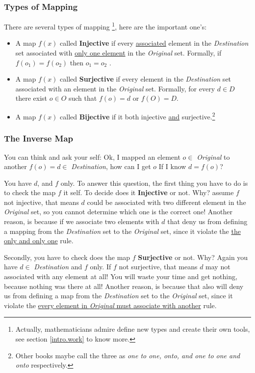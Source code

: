 \subsubsection{Types of Mapping}
There are several types of mapping \footnote{Actually, mathematicians admire define new types and create their own tools, see section \ref{intro.work} to know more.}, here are the important one's:
\begin{itemize}
    \item A map $f(x)$ called {\bf Injective} if every \underline{associated} element in the {\it Destination} set associated with \underline{only one element} in the {\it Original} set. Formally, if $f(o_1) = f(o_2)$ then $o_1 = o_2$  .
    \item A map $f(x)$ called {\bf Surjective} if every element in the {\it Destination} set associated with an element in the {\it Original} set. Formally, for every $d \in D$ there exist $o \in O$ such that $f(o)=d$ or $f(O)=D$.
    \item A map $f(x)$ called {\bf Bijective} if it both injective \underline{and} surjective.\footnote{Other books maybe call the three as {\it  one to one, onto, and one to one and onto} respectively.}
\end{itemize}
\subsubsection{The Inverse Map} You can think and ask your self: Ok, I mapped an element $o \in$ {\it Original} to another $f(o) = d \in$ {\it Destination}, how can I get $o$ If I know $d = f(o)$? 

You have $d$, and $f$ only. To answer this question, the first thing you have to do is to check the map $f$ it self. To decide does it {\bf Injective} or not. Why? assume $f$ not injective, that means $d$ could be associated with two different element in the {\it Original} set, so you cannot determine which one is the correct one! Another reason, is because if we associate two elements with $d$ that deny us from defining a mapping from the {\it Destination } set to the {\it Original} set, since it violate the \underline{the only and only one} rule.

Secondly, you have to check does the map $f$ {\bf Surjective} or not. Why? Again you have $d \in$ {\it Destination} and $f$ only. If $f$ not surjective, that means $d$ may not associated with any element at all! You will waste your time and get nothing, because nothing was there at all! Another reason, is because that also will deny us from defining a map from the {\it Destination } set to the {\it Original} set, since it violate the \underline{every element in {\it Original} must associate with another} rule.

